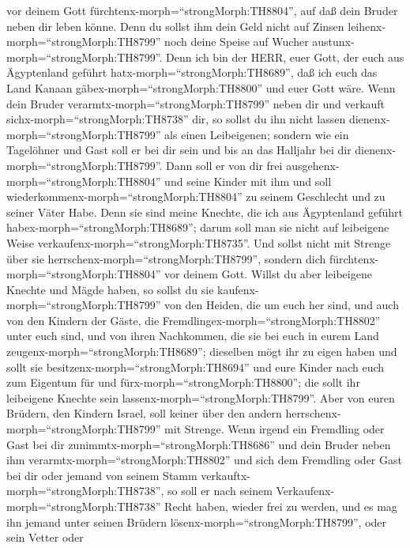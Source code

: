 vor deinem Gott fürchtenx-morph=``strongMorph:TH8804'', auf daß dein
Bruder neben dir leben könne.  Denn du sollst ihm dein Geld
nicht auf Zinsen leihenx-morph=``strongMorph:TH8799'' noch deine Speise
auf Wucher austunx-morph=``strongMorph:TH8799''.  Denn ich
bin der HERR, euer Gott, der euch aus Ägyptenland geführt
hatx-morph=``strongMorph:TH8689'', daß ich euch das Land Kanaan
gäbex-morph=``strongMorph:TH8800'' und euer Gott wäre. 
Wenn dein Bruder verarmtx-morph=``strongMorph:TH8799'' neben dir und
verkauft sichx-morph=``strongMorph:TH8738'' dir, so sollst du ihn nicht
lassen dienenx-morph=``strongMorph:TH8799'' als einen Leibeigenen;
 sondern wie ein Tagelöhner und Gast soll er bei dir sein
und bis an das Halljahr bei dir dienenx-morph=``strongMorph:TH8799''.
 Dann soll er von dir frei
ausgehenx-morph=``strongMorph:TH8804'' und seine Kinder mit ihm und soll
wiederkommenx-morph=``strongMorph:TH8804'' zu seinem Geschlecht und zu
seiner Väter Habe.  Denn sie sind meine Knechte, die ich
aus Ägyptenland geführt habex-morph=``strongMorph:TH8689''; darum soll
man sie nicht auf leibeigene Weise
verkaufenx-morph=``strongMorph:TH8735''.  Und sollst nicht
mit Strenge über sie herrschenx-morph=``strongMorph:TH8799'', sondern
dich fürchtenx-morph=``strongMorph:TH8804'' vor deinem Gott.
 Willst du aber leibeigene Knechte und Mägde haben, so
sollst du sie kaufenx-morph=``strongMorph:TH8799'' von den Heiden, die
um euch her sind,  und auch von den Kindern der Gäste, die
Fremdlingex-morph=``strongMorph:TH8802'' unter euch sind, und von ihren
Nachkommen, die sie bei euch in eurem Land
zeugenx-morph=``strongMorph:TH8689''; dieselben mögt ihr zu eigen haben
 und sollt sie besitzenx-morph=``strongMorph:TH8694'' und
eure Kinder nach euch zum Eigentum für und
fürx-morph=``strongMorph:TH8800''; die sollt ihr leibeigene Knechte sein
lassenx-morph=``strongMorph:TH8799''. Aber von euren Brüdern, den
Kindern Israel, soll keiner über den andern
herrschenx-morph=``strongMorph:TH8799'' mit Strenge.  Wenn
irgend ein Fremdling oder Gast bei dir
zunimmtx-morph=``strongMorph:TH8686'' und dein Bruder neben ihm
verarmtx-morph=``strongMorph:TH8802'' und sich dem Fremdling oder Gast
bei dir oder jemand von seinem Stamm
verkauftx-morph=``strongMorph:TH8738'',  so soll er nach
seinem Verkaufenx-morph=``strongMorph:TH8738'' Recht haben, wieder frei
zu werden, und es mag ihn jemand unter seinen Brüdern
lösenx-morph=``strongMorph:TH8799'',  oder sein Vetter oder
